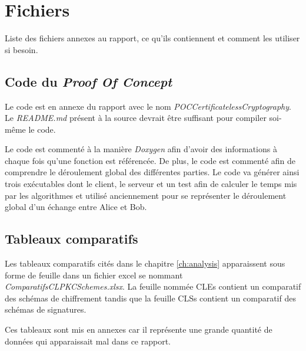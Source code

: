 \chapter{Fichiers}
\label{ch:fichiers}
Liste des fichiers annexes au rapport, ce qu'ils contiennent et comment les utiliser si besoin.
\section{Code du \textit{Proof Of Concept}}
Le code est en annexe du rapport avec le nom \textit{POCCertificatelessCryptography}.
Le \textit{README.md} présent à la source devrait être suffisant pour compiler soi-même le code. 

Le code est commenté à la manière \textit{Doxygen} afin d'avoir des informations à chaque fois qu'une fonction est référencée. De plus, le code est commenté afin de comprendre le déroulement global des différentes parties. Le code va générer ainsi trois exécutables dont le client, le serveur et un test afin de calculer le temps mis par les algorithmes et utilisé anciennement pour se représenter le déroulement global d'un échange entre Alice et Bob.
\section{Tableaux comparatifs}
Les tableaux comparatifs cités dans le chapitre \ref{ch:analysis} apparaissent sous forme de feuille dans un fichier excel se nommant \textit{ComparatifsCLPKCSchemes.xlsx}. 
La feuille nommée CLEs contient un comparatif des schémas de chiffrement tandis que la feuille CLSs contient un comparatif des schémas de signatures.

Ces tableaux sont mis en annexes car il représente une grande quantité de données qui apparaissait mal dans ce rapport.